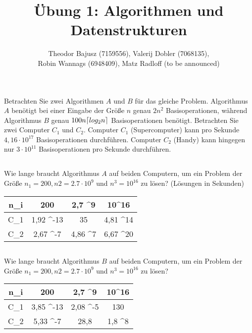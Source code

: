\documentclass[12pt]{article}
\title{Übung 1: Algorithmen und Datenstrukturen}
\author{Theodor Bajusz (7159556), Valerij Dobler (7068135), \\
Robin Wannags (6948409), Matz Radloff (to be announced)}
\theoremstyle{remark}
\DeclarePairedDelimiter\ceil{\lceil}{\rceil}
\begin{document}
\maketitle

\section{}

Betrachten Sie zwei Algorithmen $A$ und $B$ für das gleiche Problem. Algorithmus $A$ benötigt bei einer Eingabe der Größe $n$ genau $2n^2$ Basisoperationen, während Algorithmus $B$ genau $100n \ceil{ log_2 n}$ Basisoperationen benötigt. Betrachten Sie zwei Computer $C_1$ und $C_2$. Computer $C_1$ (Supercomputer) kann pro Sekunde $4,16 \cdot 10^{17}$ Basisoperationen durchführen. Computer $C_2$ (Handy) kann hingegen nur $3 \cdot 10^{11}$ Basisoperationen pro Sekunde durchführen.

\subsection{}

Wie lange braucht Algorithmus $A$ auf beiden Computern, um ein Problem der Größe $n_1 = 200, n2 = 2.7 \cdot 10^9$ und $n^3 = 10^{16}$ zu lösen? (Lösungen in Sekunden)

\begin{center}
    \begin{tabular}{C|C|C|C}
        n_i & 200 & 2,7 ^9 & 10^{16} \\ \hline
        C_1 &  1,92 ^{-13} &  35 &  4,81 ^{14} \\ \hline
        C_2 &  2,67 ^{-7} & 4,86 ^7 &  6,67 ^{20} \\
    \end{tabular}
\end{center}


\subsection{}

Wie lange braucht Algorithmus $B$ auf beiden Computern, um ein Problem der Größe $n_1 = 200, n2 = 2.7 \cdot 10^9$ und $n^3 = 10^{16}$ zu lösen?

\begin{center}
    \begin{tabular}{C|C|C|C}
        n_i & 200 & 2,7 ^9 & 10^{16} \\ \hline
        C_1 &  3,85 ^{-13} &  2,08 ^-5  &  130 \\ \hline
        C_2 &  5,33 ^{-7} & 28,8 & 1,8 ^{8} \\
    \end{tabular}
\end{center}
\end{document}
